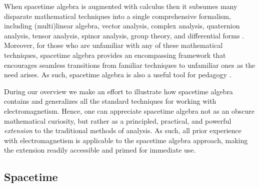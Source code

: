 \documentclass[1p,sort&compress]{elsarticle}
\numberwithin{equation}{section}
\begin{document}
When spacetime algebra is augmented with calculus then it subsumes many disparate mathematical techniques into a single comprehensive formalism, including (multi)linear algebra, vector analysis, complex analysis, quaternion analysis, tensor analysis, spinor analysis, group theory, and differential forms \cite{Hestenes1987,Hestenes1968,Hestenes1968b,Hestenes1971}.  Moreover, for those who are unfamiliar with any of these mathematical techniques, spacetime algebra provides an encompassing framework that encourages seamless transitions from familiar techniques to unfamiliar ones as the need arises.  As such, spacetime algebra is also a useful tool for pedagogy \cite{Hestenes2003,Hestenes2003b}. 

During our overview we make an effort to illustrate how spacetime algebra contains and generalizes all the standard techniques for working with electromagnetism. Hence, one can appreciate spacetime algebra not as an obscure mathematical curiosity, but rather as a principled, practical, and powerful \emph{extension} to the traditional methods of analysis.  As such, all prior experience with electromagnetism is applicable to the spacetime algebra approach, making the extension readily accessible and primed for immediate use.


\subsection{Spacetime}\label{sec:spacetime}

\end{document}
